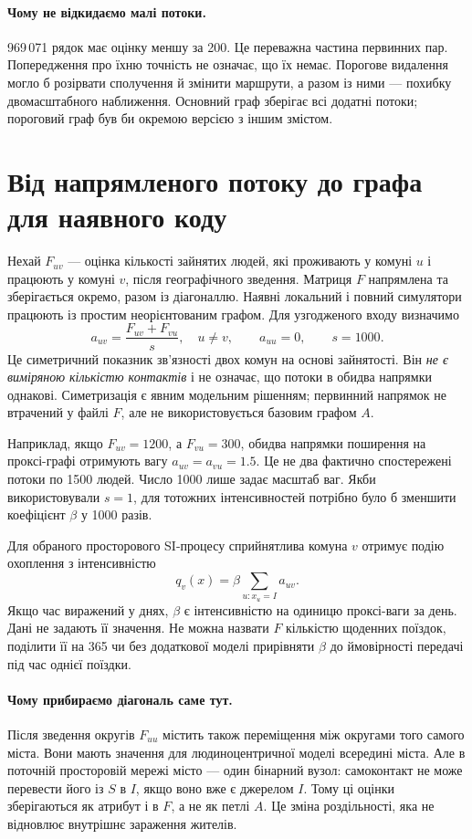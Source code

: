 \documentclass[11pt,a4paper]{article}
\begin{document}
\paragraph{Чому не відкидаємо малі потоки.}
969\,071 рядок має оцінку меншу за 200. Це переважна частина первинних пар. Попередження про їхню точність не означає, що їх немає. Порогове видалення могло б розірвати сполучення й змінити маршрути, а разом із ними --- похибку двомасштабного наближення. Основний граф зберігає всі додатні потоки; пороговий граф був би окремою версією з іншим змістом.

\section{Від напрямленого потоку до графа для наявного коду}
Нехай $F_{uv}$ --- оцінка кількості зайнятих людей, які проживають у комуні $u$ і працюють у комуні $v$, після географічного зведення. Матриця $F$ напрямлена та зберігається окремо, разом із діагоналлю. Наявні локальний і повний симулятори працюють із простим неорієнтованим графом. Для узгодженого входу визначимо
\[
a_{uv}=\frac{F_{uv}+F_{vu}}{s},\quad u\ne v,
\qquad a_{uu}=0,\qquad s=1000.
\]
Це симетричний показник зв'язності двох комун на основі зайнятості. Він \emph{не є виміряною кількістю контактів} і не означає, що потоки в обидва напрямки однакові. Симетризація є явним модельним рішенням; первинний напрямок не втрачений у файлі $F$, але не використовується базовим графом $A$.

Наприклад, якщо $F_{uv}=1200$, а $F_{vu}=300$, обидва напрямки поширення на проксі-графі отримують вагу $a_{uv}=a_{vu}=1.5$. Це не два фактично спостережені потоки по 1500 людей. Число 1000 лише задає масштаб ваг. Якби використовували $s=1$, для тотожних інтенсивностей потрібно було б зменшити коефіцієнт $\beta$ у 1000 разів.

Для обраного просторового SI-процесу сприйнятлива комуна $v$ отримує подію охоплення з інтенсивністю
\[
q_v(x)=\beta\sum_{u:x_u=I}a_{uv}.
\]
Якщо час виражений у днях, $\beta$ є інтенсивністю на одиницю проксі-ваги за день. Дані не задають її значення. Не можна назвати $F$ кількістю щоденних поїздок, поділити її на 365 чи без додаткової моделі прирівняти $\beta$ до ймовірності передачі під час однієї поїздки.

\paragraph{Чому прибираємо діагональ саме тут.}
Після зведення округів $F_{uu}$ містить також переміщення між округами того самого міста. Вони мають значення для людиноцентричної моделі всередині міста. Але в поточній просторовій мережі місто --- один бінарний вузол: самоконтакт не може перевести його із $S$ в $I$, якщо воно вже є джерелом $I$. Тому ці оцінки зберігаються як атрибут і в $F$, а не як петлі $A$. Це зміна роздільності, яка не відновлює внутрішнє зараження жителів.
\end{document}
